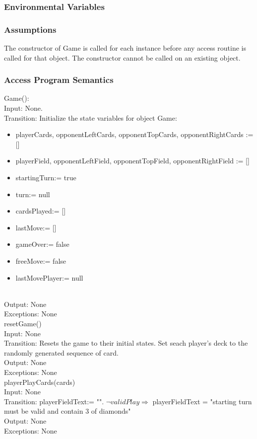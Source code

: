 \documentclass[12pt, titlepage]{article}
\begin{document}
\subsubsection{Environmental Variables}

\subsubsection{Assumptions}
The constructor of Game is called for each instance before any access routine is called for that object. The constructor cannot be called on an existing object.
\subsubsection{Access Program Semantics} 

Game(): \\
Input: None.\\
Transition: Initialize the state variables for object Game: 
\begin{itemize}
    \item playerCards, opponentLeftCards, opponentTopCards, opponentRightCards := []
    \item playerField, opponentLeftField, opponentTopField, opponentRightField := []
    \item startingTurn:= true
    \item turn:= null
    \item cardsPlayed:= []
    \item lastMove:= []
    \item gameOver:= false
    \item freeMove:= false
    \item lastMovePlayer:= null
\end{itemize}\\
Output: None\\
Exceptions: None \\

\noindent resetGame()\\
Input: None\\
Transition: Resets the game to their initial states. Set seach player's deck to the randomly generated sequence of card.\\
Output: None\\
Exceptions: None \\

\noindent playerPlayCards(cards)\\
Input: None\\
Transition: playerFieldText:= "". $\neg validPlay \Rightarrow$ playerFieldText = "starting turn must be valid and contain 3 of diamonds"\\
Output: None\\
Exceptions: None \\
\end{document}

